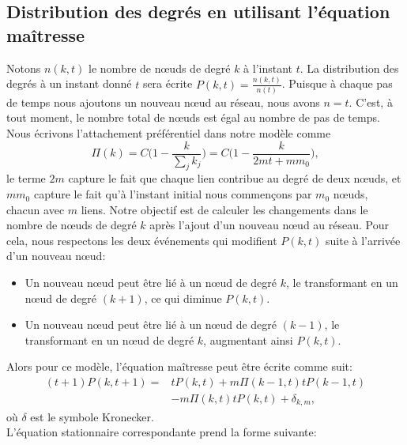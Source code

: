 \subsection{Distribution des degrés en utilisant l'équation maîtresse}
Notons $n(k,t)$ le nombre de nœuds de degré $k$ à l'instant $t$. La distribution des degrés à un instant donné $t$ sera écrite $P(k,t)=\frac{n(k,t)}{n(t)}$. Puisque à chaque pas de temps nous ajoutons un nouveau nœud au réseau, nous avons $n=t$. C'est, à tout moment, le nombre total de nœuds est égal au nombre de pas de temps.\\
Nous écrivons l'attachement préférentiel dans notre modèle comme
\begin{equation}
\Pi(k)=C\big(1-\frac{k}{\sum_jk_j}\big)=C\big(1-\frac{k}{2mt+mm_0}\big),
\end{equation}
le terme $2m$ capture le fait que chaque lien contribue au degré de deux nœuds, et $mm_0$ capture le fait qu'à l'instant initial nous commençons par $m_0$ nœuds, chacun avec $m$ liens. Notre objectif est de calculer les changements dans le nombre de nœuds de degré $k$ après l'ajout d'un nouveau nœud au réseau. Pour cela, nous respectons les deux événements qui modifient $P(k,t)$ suite à l'arrivée d'un nouveau nœud:
\begin{itemize}
	\item Un nouveau nœud peut être lié à un nœud de degré $k$, le transformant en un nœud de degré $(k+1)$, ce qui diminue $P(k,t)$.
	\item Un nouveau nœud peut être lié à un nœud de degré $(k-1)$, le transformant en un nœud de degré $k$, augmentant ainsi $P(k,t)$.
\end{itemize}
Alors pour ce modèle, l'équation maîtresse peut être écrite comme suit:
\begin{equation}
\begin{aligned}
(t+1)P(k,t+1)= &tP(k,t)+m\Pi(k-1,t)tP(k-1,t)\\
& -m\Pi(k,t)tP(k,t)+\delta_{k,m},
\end{aligned}
\end{equation}
où $\delta$ est le symbole Kronecker.\\
L'équation stationnaire correspondante prend la forme suivante:

